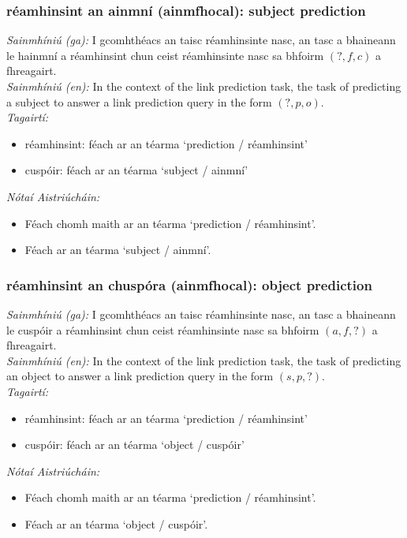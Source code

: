 \subsubsection*{réamhinsint an ainmní (ainmfhocal): subject prediction}
 \noindent \textit{Sainmhíniú (ga):} I gcomhthéacs an taisc réamhinsinte nasc, an tasc a bhaineann le hainmní a réamhinsint chun ceist réamhinsinte nasc sa bhfoirm $(?,f,c)$ a fhreagairt.
\\
 \noindent \textit{Sainmhíniú (en):} In the context of the link prediction task, the task of predicting a subject to answer a link prediction query in the form $(?,p,o)$.
\\
 \noindent \textit{Tagairtí:}
\begin{itemize}
	\item réamhinsint: féach ar an téarma `prediction / réamhinsint'
	\item cuspóir: féach ar an téarma `subject / ainmní'
\end{itemize}

 \noindent \textit{Nótaí Aistriúcháin:}
\begin{itemize}
	\item Féach chomh maith ar an téarma `prediction / réamhinsint'.
	\item Féach ar an téarma `subject / ainmní'.
\end{itemize}


\subsubsection*{réamhinsint an chuspóra (ainmfhocal): object prediction}
 \noindent \textit{Sainmhíniú (ga):} I gcomhthéacs an taisc réamhinsinte nasc, an tasc a bhaineann le cuspóir a réamhinsint chun ceist réamhinsinte nasc sa bhfoirm $(a,f,?)$ a fhreagairt.
\\
 \noindent \textit{Sainmhíniú (en):} In the context of the link prediction task, the task of predicting an object to answer a link prediction query in the form $(s,p,?)$.
\\
 \noindent \textit{Tagairtí:}
\begin{itemize}
	\item réamhinsint: féach ar an téarma `prediction / réamhinsint'
	\item cuspóir: féach ar an téarma `object / cuspóir'
\end{itemize}

 \noindent \textit{Nótaí Aistriúcháin:}
\begin{itemize}
	\item Féach chomh maith ar an téarma `prediction / réamhinsint'.
	\item Féach ar an téarma `object / cuspóir'.
\end{itemize}


